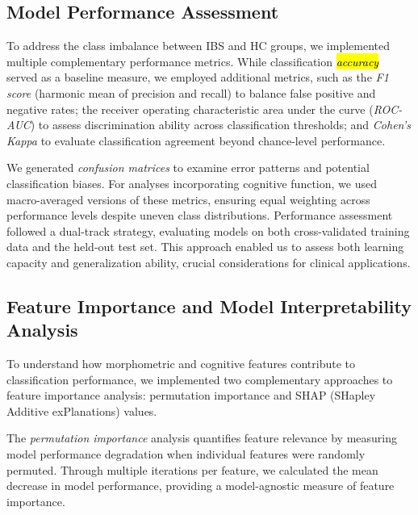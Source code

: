 \documentclass[diagnostics,article,accept,pdftex,moreauthors]{Definitions/mdpi}
\begin{document}
\subsection{Model Performance Assessment}
To address the class imbalance between IBS and HC groups, we implemented multiple complementary performance metrics. While classification \textit{\hl{accuracy} %
} served as a baseline measure, we employed additional metrics, such as the \textit{F1 score} (harmonic mean of precision and recall) to balance false positive and negative rates; the receiver operating characteristic area under the curve (\textit{ROC-AUC}) to assess discrimination ability across classification thresholds; and \textit{Cohen's Kappa} \cite{cohen1960coefficient} to evaluate classification agreement beyond chance-level performance. 

We generated \textit{confusion matrices} to examine error patterns and potential classification biases. For analyses incorporating cognitive function, we used macro-averaged versions of these metrics, ensuring equal weighting across performance levels despite uneven class distributions. Performance assessment followed a dual-track strategy, evaluating models on both cross-validated training data and the held-out test set. This approach enabled us to assess both learning capacity and generalization ability, crucial considerations for clinical applications. 



\subsection{Feature Importance and Model Interpretability Analysis}

To understand how morphometric and cognitive features contribute to classification performance, we implemented two complementary approaches to feature importance analysis: permutation importance and SHAP (SHapley Additive exPlanations) values.

The \textit{permutation importance} \cite{breiman2001random} analysis quantifies feature relevance by measuring model performance degradation when individual features were randomly permuted. Through multiple iterations per feature, we calculated the mean decrease in model performance, providing a model-agnostic measure of feature importance.
\end{document}
